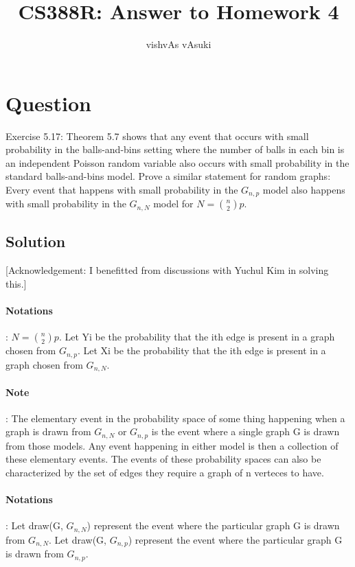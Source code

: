 \documentclass[10pt]{article}
\title{CS388R: Answer to Homework 4}
\author{vishvAs vAsuki}
\begin{document}
\maketitle

\section{Question}
Exercise 5.17: Theorem 5.7 shows that any event that occurs with small probability in the balls-and-bins setting where the number of balls in each bin is an independent Poisson random variable also occurs with small probability in the standard balls-and-bins model. Prove a similar statement for random graphs: Every event that happens with small probability in the $G_{n,p}$ model also happens with small probability in the $G_{n,N}$ model for $N=\binom{n}{2}p$.

\subsection{Solution}
[Acknowledgement: I benefitted from discussions with Yuchul Kim in solving this.]

\paragraph{Notations}: $N=\binom{n}{2}p$. Let Yi be the probability that the ith edge is present in a graph chosen from $G_{n,p}$. Let Xi be the probability that the ith edge is present in a graph chosen from $G_{n,N}$.

\paragraph{Note}: The elementary event in the probability space of some thing happening when a graph is drawn from $G_{n,N}$ or $G_{n,p}$ is the event where a single graph G is drawn from those models. Any event happening in either model is then a collection of these elementary events. The events of these probability spaces can also be characterized by the set of edges they require a graph of n verteces to have.

\paragraph{Notations}: Let draw(G, $G_{n,N}$) represent the event where the particular graph G is drawn from $G_{n,N}$. Let draw(G, $G_{n,p}$) represent the event where the particular graph G is drawn from $G_{n,p}$.
\end{document}
